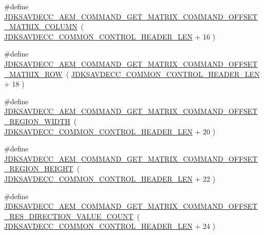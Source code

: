 \begin{DoxyCompactItemize}
\item 
\#define \hyperlink{group__command__get__matrix_ga1f80a2bf6da9ce33a70ddccff361ff7b}{J\+D\+K\+S\+A\+V\+D\+E\+C\+C\+\_\+\+A\+E\+M\+\_\+\+C\+O\+M\+M\+A\+N\+D\+\_\+\+G\+E\+T\+\_\+\+M\+A\+T\+R\+I\+X\+\_\+\+C\+O\+M\+M\+A\+N\+D\+\_\+\+O\+F\+F\+S\+E\+T\+\_\+\+M\+A\+T\+R\+I\+X\+\_\+\+C\+O\+L\+U\+MN}~( \hyperlink{group__jdksavdecc__avtp__common__control__header_gaae84052886fb1bb42f3bc5f85b741dff}{J\+D\+K\+S\+A\+V\+D\+E\+C\+C\+\_\+\+C\+O\+M\+M\+O\+N\+\_\+\+C\+O\+N\+T\+R\+O\+L\+\_\+\+H\+E\+A\+D\+E\+R\+\_\+\+L\+EN} + 16 )
\item 
\#define \hyperlink{group__command__get__matrix_ga9f9904d50abca4e5dbead457744fb0ef}{J\+D\+K\+S\+A\+V\+D\+E\+C\+C\+\_\+\+A\+E\+M\+\_\+\+C\+O\+M\+M\+A\+N\+D\+\_\+\+G\+E\+T\+\_\+\+M\+A\+T\+R\+I\+X\+\_\+\+C\+O\+M\+M\+A\+N\+D\+\_\+\+O\+F\+F\+S\+E\+T\+\_\+\+M\+A\+T\+R\+I\+X\+\_\+\+R\+OW}~( \hyperlink{group__jdksavdecc__avtp__common__control__header_gaae84052886fb1bb42f3bc5f85b741dff}{J\+D\+K\+S\+A\+V\+D\+E\+C\+C\+\_\+\+C\+O\+M\+M\+O\+N\+\_\+\+C\+O\+N\+T\+R\+O\+L\+\_\+\+H\+E\+A\+D\+E\+R\+\_\+\+L\+EN} + 18 )
\item 
\#define \hyperlink{group__command__get__matrix_gaa012167ea5c83bbb7030b983424090c0}{J\+D\+K\+S\+A\+V\+D\+E\+C\+C\+\_\+\+A\+E\+M\+\_\+\+C\+O\+M\+M\+A\+N\+D\+\_\+\+G\+E\+T\+\_\+\+M\+A\+T\+R\+I\+X\+\_\+\+C\+O\+M\+M\+A\+N\+D\+\_\+\+O\+F\+F\+S\+E\+T\+\_\+\+R\+E\+G\+I\+O\+N\+\_\+\+W\+I\+D\+TH}~( \hyperlink{group__jdksavdecc__avtp__common__control__header_gaae84052886fb1bb42f3bc5f85b741dff}{J\+D\+K\+S\+A\+V\+D\+E\+C\+C\+\_\+\+C\+O\+M\+M\+O\+N\+\_\+\+C\+O\+N\+T\+R\+O\+L\+\_\+\+H\+E\+A\+D\+E\+R\+\_\+\+L\+EN} + 20 )
\item 
\#define \hyperlink{group__command__get__matrix_gadc5921f2a3ea78f10063e00679ceefbc}{J\+D\+K\+S\+A\+V\+D\+E\+C\+C\+\_\+\+A\+E\+M\+\_\+\+C\+O\+M\+M\+A\+N\+D\+\_\+\+G\+E\+T\+\_\+\+M\+A\+T\+R\+I\+X\+\_\+\+C\+O\+M\+M\+A\+N\+D\+\_\+\+O\+F\+F\+S\+E\+T\+\_\+\+R\+E\+G\+I\+O\+N\+\_\+\+H\+E\+I\+G\+HT}~( \hyperlink{group__jdksavdecc__avtp__common__control__header_gaae84052886fb1bb42f3bc5f85b741dff}{J\+D\+K\+S\+A\+V\+D\+E\+C\+C\+\_\+\+C\+O\+M\+M\+O\+N\+\_\+\+C\+O\+N\+T\+R\+O\+L\+\_\+\+H\+E\+A\+D\+E\+R\+\_\+\+L\+EN} + 22 )
\item 
\#define \hyperlink{group__command__get__matrix_gaac7a7dd8a12748caca77b21b496acd83}{J\+D\+K\+S\+A\+V\+D\+E\+C\+C\+\_\+\+A\+E\+M\+\_\+\+C\+O\+M\+M\+A\+N\+D\+\_\+\+G\+E\+T\+\_\+\+M\+A\+T\+R\+I\+X\+\_\+\+C\+O\+M\+M\+A\+N\+D\+\_\+\+O\+F\+F\+S\+E\+T\+\_\+\+R\+E\+S\+\_\+\+D\+I\+R\+E\+C\+T\+I\+O\+N\+\_\+\+V\+A\+L\+U\+E\+\_\+\+C\+O\+U\+NT}~( \hyperlink{group__jdksavdecc__avtp__common__control__header_gaae84052886fb1bb42f3bc5f85b741dff}{J\+D\+K\+S\+A\+V\+D\+E\+C\+C\+\_\+\+C\+O\+M\+M\+O\+N\+\_\+\+C\+O\+N\+T\+R\+O\+L\+\_\+\+H\+E\+A\+D\+E\+R\+\_\+\+L\+EN} + 24 )

\end{DoxyCompactItemize}
